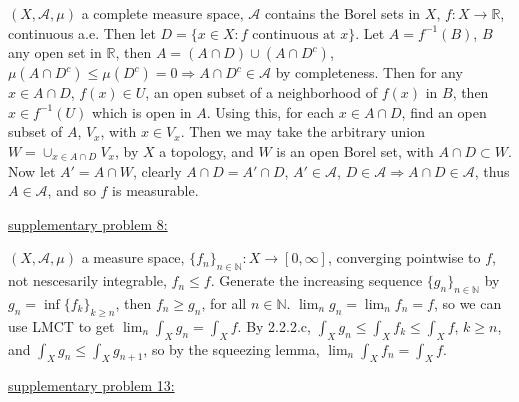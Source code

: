 \documentclass[12pt]{article}
\newcommand{\nats}[0] { \mathbb{N}}
\newcommand{\reals}[0] { \mathbb{R}}
\newcommand{\rimply}[0] { \Rightarrow }
\begin{document}
\begin{flushleft}
$(X,\mathcal A, \mu )$ a complete measure space, $\mathcal A$ contains the Borel sets in $X$, $f:X \rightarrow \reals$, continuous a.e. Then let $D = \{ x \in X: f\textrm{ continuous at } x\}$.
Let $A = f^{-1} (B)$, $B$ any open set in $\reals$, then $A = (A \cap D)\cup(A \cap D^c)$, $\mu(A \cap D^c) \le \mu(D^c) = 0 \Rightarrow A \cap D^c \in \mathcal A$ by completeness. Then for any $x \in A \cap D$, $f(x) \in U$, an open subset of a neighborhood of $f(x)$ in $B$, then $x \in f^{-1}(U)$ which is open in $A$. Using this, for each $x \in A \cap D$, find an open subset of $A$, $V_x$, with $x \in V_x$. Then we may take the arbitrary union $W = \cup_{x \in A \cap D} V_x$, by $X$ a topology, and $W$ is an open Borel set, with $ A \cap D \subset W$. Now let $A' = A \cap W$, clearly $A \cap D = A' \cap D$, $A' \in \mathcal A$, $D \in \mathcal A \rimply A \cap D \in \mathcal A$, thus $A \in \mathcal A$, and so $f$ is measurable.
\end{flushleft}


\begin{flushleft}
\underline{supplementary problem 8:}
\end{flushleft}

\begin{flushleft}
$(X,\mathcal A, \mu )$ a measure space, $\{ f_n\}_{n \in \nats}:X \rightarrow [0,\infty]$, converging pointwise to $f$, not nescesarily integrable, $f_n \le f$. Generate the increasing sequence $\{ g_n \}_{n \in \nats}$ by $g_n = \inf \{ f_k \}_{k \ge n}$, then $f_n \ge g_n$, for all $n \in \nats$. $\lim_{n} g_n = \lim_{n} f_n = f$, so we can use LMCT to get $\lim_{n} \int_X g_n = \int_X f$. By 2.2.2.c, $\int_X g_n \le \int_X f_k  \le \int_X f$, $k \ge n$, and $\int_X g_n \le \int_X g_{n+1}$, so by the squeezing lemma, $\lim_{n} \int_X f_n = \int_X f$.
\end{flushleft}


\begin{flushleft}
\underline{supplementary problem 13:}
\end{flushleft}
\end{document}
